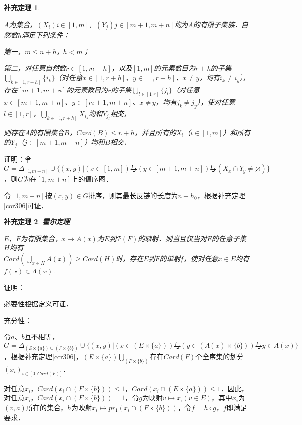 \documentclass[12pt, a4paper, oneside]{book}
\newtheorem{cor}{补充定理}
\begin{document}
			\begin{cor}\label{cor307}
				\hfill\par
				$A$为集合，$(X_i)i\in [1, m]$，$(Y_j)j\in [m+1, m+n]$均为$A$的有限子集族．自然数$h$满足下列条件：
				\par
				第一，$m\leq n+h$，$h<m$；
				\par
				第二，对任意自然数$r\in [1, m-h]$，以及$[1, m]$的元素数目为$r+h$的子集$\bigcup\limits_{k\in [1, r+h]}\{i_k\}$（对任意$x\in [1, r+h]$、$y \in [1, r+h]$、$x\neq y$，均有$i_k\neq i_y$），存在$[m+1, m+n]$的元素数目为$r$的子集$\bigcup\limits_{l\in [1, r]}\{j_l\}$（对任意$x\in [m+1, m+n]$、$y \in [m+1, m+n]$、$x\neq y$，均有$j_k\neq j_y$），使对任意$l\in [1, r]$，$\bigcup\limits_{k\in [1, r+h]}X_{i_k}$均和$Y_{j_l}$相交，
				\par
				则存在$A$的有限集合$B$，$Card(B)\leq n+h$，并且所有的$X_i$（$i\in [1, m]$）和所有的$Y_j$（$j\in [m+1, m+n]$）均和$B$相交．
			\end{cor}
			证明：令$G=\Delta_{[1, m+n]}\cup\{(x, y)|(x\in [1, m])\text{与}(y\in [m+1, m+n])\text{与}(X_x\cap Y_y\neq \varnothing)\}$，则$G$为在$[1, m+n]$上的偏序图．
			\par
			令$[1, m+n]$按$(x, y)\in G$排序，则其最长反链的长度为$n+h_0$，根据补充定理\ref{cor306}可证．
						
			\begin{cor}\label{cor308}
				\textbf{霍尔定理}
				\par
				$E$、$F$为有限集合，$x\mapsto A(x)$为$E$到$\mathcal{P}(F)$的映射．则当且仅当对$E$的任意子集$H$均有\\$Card(\bigcup\limits_{x\in H}A(x))\geq Card(H)$时，存在$E$到$F$的单射$f$，使对任意$x\in E$均有$f(x)\in A(x)$．	
			\end{cor}
			证明：
			\par
			必要性根据定义可证．
			\par
			充分性：
			\par
			令$a$、$b$互不相等，$G=\Delta_{(E\times \{a\})\cup(F\times \{b\})}\cup\{(x, y)|(x\in (E\times \{a\}))\text{与}(y\in (A(x)\times \{b\}))\text{与}y\in A(x)\}$，根据补充定理\ref{cor306}，$(E\times \{a\})\bigcup\limits_(F\times \{b\})$存在$Card(F)$个全序集的划分\\$(x_i)_{i\in [0, Card(F)]}$．
			\par
			对任意$x_i$，$Card(x_i\cap(F\times \{b\}))\leq 1$，$Card(x_i\cap(E\times \{a\}))\leq 1$．因此，对任意$x_i$，$Card(x_i\cap(F\times \{b\}))=1$，令$g$为映射$v\mapsto x_i(v\in E)$，其中$x_i$为$(v, a)$所在的集合，$h$为映射$x_i\mapsto pr_1(x_i\cap(F\times \{b\}))$，令$f=h\circ g$，$f$即满足要求．
						
\end{document}
